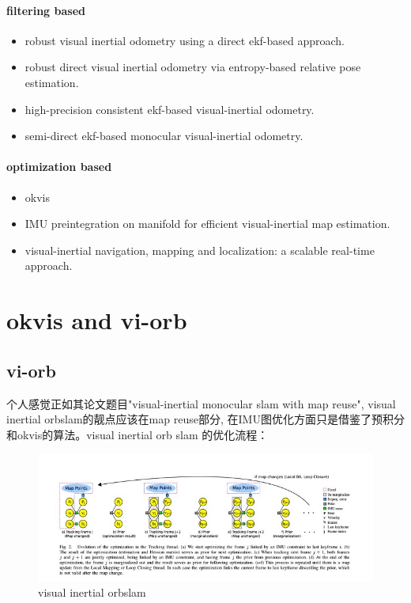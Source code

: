 \documentclass[10pt,a4paper]{article}
\begin{document}
\paragraph{filtering based}
\begin{itemize}
	\item robust visual inertial odometry using a direct ekf-based approach.
	\item robust direct visual inertial odometry via entropy-based relative pose estimation.
	\item high-precision consistent ekf-based visual-inertial odometry.
	\item semi-direct ekf-based monocular visual-inertial odometry.
\end{itemize}

\paragraph{optimization based}
\begin{itemize}
	\item okvis
	\item IMU preintegration on manifold for efficient visual-inertial map estimation.
	\item visual-inertial navigation, mapping and localization: a scalable real-time approach.
\end{itemize}


\section{okvis and vi-orb}
\subsection{vi-orb}
个人感觉正如其论文题目"visual-inertial monocular slam with map reuse", visual inertial orbslam的靓点应该在map reuse部分, 在IMU图优化方面只是借鉴了预积分和okvis的算法。visual inertial orb slam 的优化流程：
\begin{figure}[h]
	\centering
	\includegraphics[width=1.2\linewidth]{images/vi-orb-optimization}
	\caption{visual inertial orbslam}
	\label{fig:vi-orb-optimization}
\end{figure}
\end{document}

